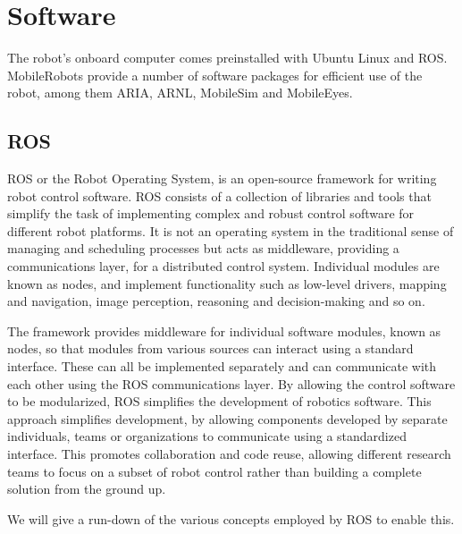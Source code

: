 \documentclass[\rootfolder/main.tex]{subfiles}
\begin{document}

\section{Software}

The robot's onboard computer comes preinstalled with Ubuntu Linux and ROS.
MobileRobots provide a number of software packages for efficient use of the robot, among them ARIA, ARNL, MobileSim and MobileEyes.


\subsection{ROS}

ROS or the Robot Operating System, is an open-source framework for writing robot control software.
ROS consists of a collection of libraries and tools that simplify the task of implementing complex and robust control software for different robot platforms.
It is not an operating system in the traditional sense of managing and scheduling processes but acts as middleware, providing a communications layer, for a distributed control system.
Individual modules are known as nodes, and implement functionality such as low-level drivers, mapping and navigation, image perception, reasoning and decision-making and so on.

The framework provides middleware for individual software modules, known as nodes, so that modules from various sources can interact using a standard interface.
These can all be implemented separately and can communicate with each other using the ROS communications layer.
By allowing the control software to be modularized, ROS simplifies the development of robotics software.
This approach simplifies development, by allowing components developed by separate individuals, teams or organizations to communicate using a standardized interface.
This promotes collaboration and code reuse, allowing different research teams to focus on a subset of robot control rather than building a complete solution from the ground up.

We will give a run-down of the various concepts employed by ROS to enable this.
\end{document}
